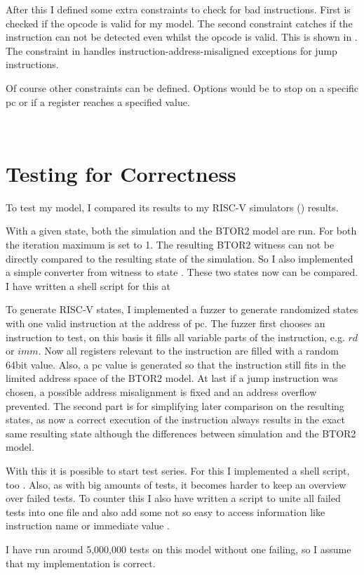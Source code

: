 After this I defined some extra constraints to check for bad
instructions. First is checked if the opcode is valid for my model.
The second constraint catches if the instruction can not be detected
even whilst the opcode is valid. This is shown in
. The constraint in 
handles instruction-address-misaligned exceptions for jump
instructions.

Of course other constraints can be defined. Options would be to stop
on a specific pc or if a register reaches a specified value.

\\ 





\section{Testing for Correctness}\label{sec:corectness}
To test my model, I compared its results to my RISC-V simulators
() results.

With a given state, both the simulation and the BTOR2 model are run.
For both the iteration maximum is set to 1. The resulting BTOR2
witness can not be directly compared to the resulting state of the
simulation. So I also implemented a simple converter from witness to
state \cite[src/restate\_witness.c]{repoRV2BTOR}. These two states
now can be compared. I have written a shell script for this at
\cite[sh\_utils/compare\_iterations.sh]{repoRV2BTOR}

To generate RISC-V states, I implemented a fuzzer
\cite[src/state\_fuzzer.c]{repoRV2BTOR} to generate randomized states
with one valid instruction at the address of pc. The fuzzer first
chooses an instruction to test, on this basis it fills all variable
parts of the instruction, e.g. $rd$ or $imm$. Now all registers
relevant to the instruction are filled with a random 64bit value.
Also, a pc value is generated so that the instruction still fits in
the limited address space of the BTOR2 model. At last if a jump
instruction was chosen, a possible address misalignment is fixed and
an address overflow prevented. The second part is for simplifying
later comparison on the resulting states, as now a correct execution
of the instruction always results in the exact same resulting state
although the differences between simulation and the BTOR2 model.

With this it is possible to start test series. For this I implemented
a shell script, too
\cite[sh\_utils/test\_btor2\_model.sh]{repoRV2BTOR}. Also, as with
big amounts of tests, it becomes harder to keep an overview over
failed tests. To counter this I also have written a script to unite
all failed tests into one file and also add some not so easy to
access information like instruction name or immediate value
\cite[sh\_utils/diff\_logger.sh]{repoRV2BTOR}.

I have run around 5,000,000 tests on this model without one failing,
so I assume that my implementation is correct.
